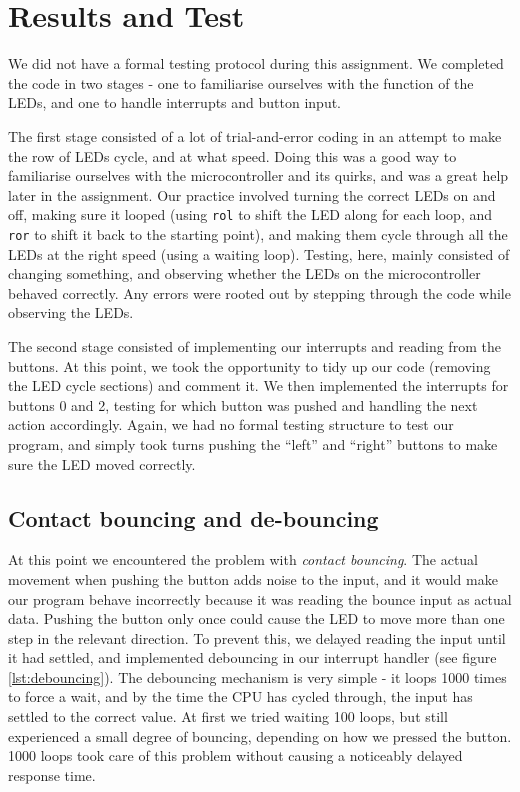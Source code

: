 \section{Results and Test}
We did not have a formal testing protocol during this assignment. We completed the code in two stages - one to familiarise ourselves with the function of the LEDs, and one to handle interrupts and button input. 

The first stage consisted of a lot of trial-and-error coding in an attempt to make the row of LEDs cycle, and at what speed. Doing this was a good way to familiarise ourselves with the microcontroller and its quirks, and was a great help later in the assignment. Our practice involved turning the correct LEDs on and off, making sure it looped (using \texttt{rol} to shift the LED along for each loop, and \texttt{ror} to shift it back to the starting point), and making them cycle through all the LEDs at the right speed (using a waiting loop). Testing, here, mainly consisted of changing something, and observing whether the LEDs on the microcontroller behaved correctly. Any errors were rooted out by stepping through the code while observing the LEDs.

The second stage consisted of implementing our interrupts and reading from the buttons. At this point, we took the opportunity to tidy up our code (removing the LED cycle sections) and comment it. We then implemented the interrupts for buttons 0 and 2, testing for which button was pushed and handling the next action accordingly. Again, we had no formal testing structure to test our program, and simply took turns pushing the ``left'' and ``right'' buttons to make sure the LED moved correctly. 

\subsection{Contact bouncing and de-bouncing}
At this point we encountered the problem with {\em contact bouncing}. The actual movement when pushing the button adds noise to the input, and it would make our program behave incorrectly because it was reading the bounce input as actual data. Pushing the button only once could cause the LED to move more than one step in the relevant direction. To prevent this, we delayed reading the input until it had settled, and implemented debouncing in our interrupt handler (see figure \ref{lst:debouncing}). The debouncing mechanism is very simple - it loops 1000 times to force a wait, and by the time the CPU has cycled through, the input has settled to the correct value. At first we tried waiting 100 loops, but still experienced a small degree of bouncing, depending on how we pressed the button. 1000 loops took care of this problem without causing a noticeably delayed response time.

